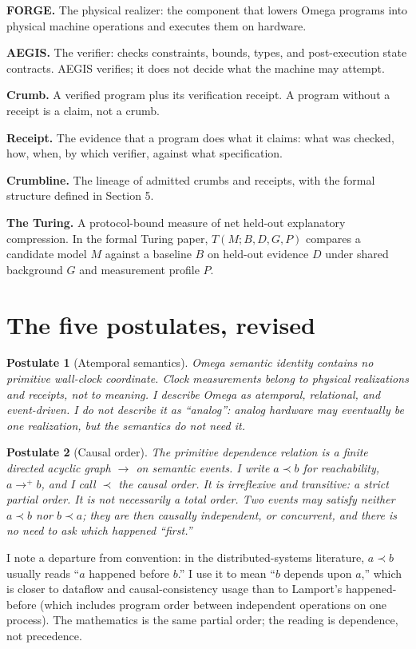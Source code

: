 \documentclass[11pt]{article}
\newtheorem{postulate}{Postulate}
\begin{document}
\textbf{FORGE.} The physical realizer: the component that lowers Omega programs into physical machine operations and executes them on hardware.

\textbf{AEGIS.} The verifier: checks constraints, bounds, types, and post-execution state contracts. AEGIS verifies; it does not decide what the machine may attempt.

\textbf{Crumb.} A verified program plus its verification receipt. A program without a receipt is a claim, not a crumb.

\textbf{Receipt.} The evidence that a program does what it claims: what was checked, how, when, by which verifier, against what specification.

\textbf{Crumbline.} The lineage of admitted crumbs and receipts, with the formal structure defined in Section 5.

\textbf{The Turing.} A protocol-bound measure of net held-out explanatory compression. In the formal Turing paper, $T(M;B,D,G,P)$ compares a candidate model $M$ against a baseline $B$ on held-out evidence $D$ under shared background $G$ and measurement profile $P$.

\section{The five postulates, revised}

\begin{postulate}[Atemporal semantics]
Omega semantic identity contains no primitive wall-clock coordinate. Clock measurements belong to physical realizations and receipts, not to meaning. I describe Omega as atemporal, relational, and event-driven. I do not describe it as ``analog'': analog hardware may eventually be one realization, but the semantics do not need it.
\end{postulate}

\begin{postulate}[Causal order]
The primitive dependence relation is a finite directed acyclic graph $\to$ on semantic events. I write $a \prec b$ for reachability, $a \to^+ b$, and I call $\prec$ the causal order. It is irreflexive and transitive: a strict partial order. It is not necessarily a total order. Two events may satisfy neither $a \prec b$ nor $b \prec a$; they are then causally independent, or concurrent, and there is no need to ask which happened ``first.''
\end{postulate}

I note a departure from convention: in the distributed-systems literature, $a \prec b$ usually reads ``$a$ happened before $b$.'' I use it to mean ``$b$ depends upon $a$,'' which is closer to dataflow and causal-consistency usage than to Lamport's happened-before (which includes program order between independent operations on one process). The mathematics is the same partial order; the reading is dependence, not precedence.
\end{document}
